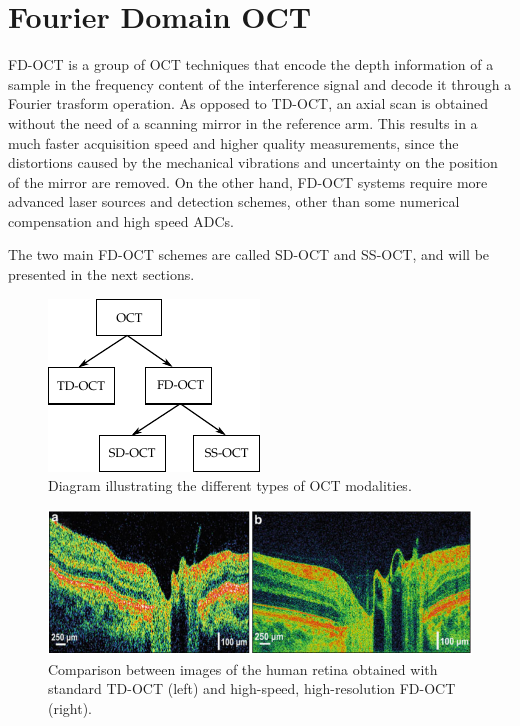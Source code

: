\section{Fourier Domain OCT}
\label{sec:fdoct}
\acf{FD-OCT} is a group of OCT techniques that encode the depth information of a sample in the frequency content of the interference signal and decode it through a Fourier trasform operation. As opposed to \ac{TD-OCT}, an axial scan is obtained without the need of a scanning mirror in the reference arm. This results in a much faster acquisition speed and higher quality measurements, since the distortions caused by the mechanical vibrations and uncertainty on the position of the mirror are removed. On the other hand, \ac{FD-OCT} systems require more advanced laser sources and detection schemes, other than some numerical compensation and high speed \acp{ADC}. 


The two main \ac{FD-OCT} schemes are called \acf{SD-OCT} and \acf{SS-OCT}, and will be presented in the next sections. 

\begin{figure}[hbt]
	\myfloatalign
	\includegraphics[width=0.5\linewidth]{gfx/ch2/oct-modalities}
	\caption{Diagram illustrating the different types of OCT modalities.}\label{fig:oct-modalities}
\end{figure}

\begin{figure}[hbt]
	\myfloatalign
	\includegraphics[width=0.95\linewidth]{gfx/ch2/td-fd-comparison}
	\caption{Comparison between images of the human retina obtained with standard \ac{TD-OCT} (left) and high-speed, high-resolution \ac{FD-OCT} (right).}\label{fig:td-fd-comparison}
\end{figure}

